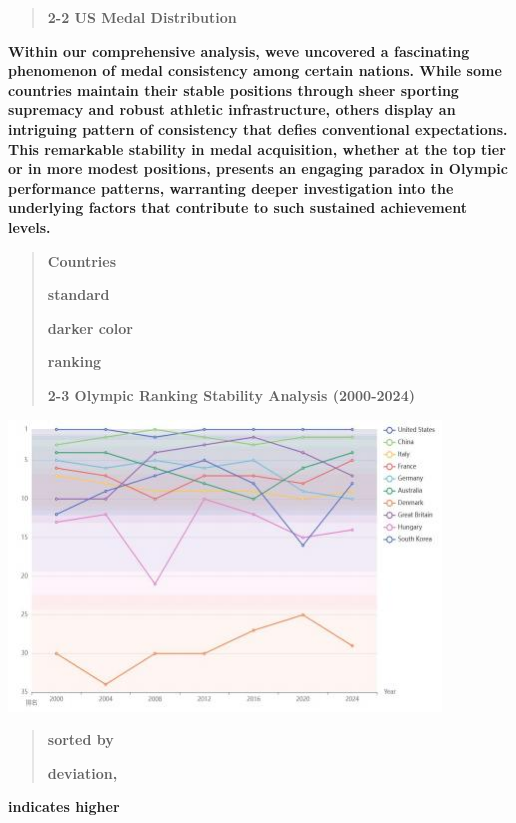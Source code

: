 \documentclass[12pt,a4paper]{article}
\renewenvironment{quote}{\begin{quotation}}{\end{quotation}}  %
\begin{document}
    \begin{quote}
    \textbf{2-2 US Medal Distribution}
    \end{quote}
    
    \textbf{Within our comprehensive analysis, we\textquotesingle ve
    uncovered a fascinating phenomenon of medal consistency among certain
    nations. While some countries maintain their stable positions through
    sheer sporting supremacy and robust athletic infrastructure, others
    display an intriguing pattern of consistency that defies conventional
    expectations. This remarkable stability in medal acquisition, whether at
    the top tier or in more modest positions, presents an engaging paradox
    in Olympic performance patterns, warranting deeper investigation into
    the underlying factors that contribute to such sustained achievement
    levels.}
    
    \begin{quote}
    \textbf{Countries}
    
    \textbf{standard}
    
    \textbf{darker color}
    
    \textbf{ranking}
    
    \textbf{2-3 Olympic Ranking Stability Analysis (2000-2024)}
    \end{quote}
    
    \includegraphics[width=4.52167in,height=3.0421in]{./media/media/image5.jpeg}
    
    \begin{quote}
    \textbf{sorted by}
    
    \textbf{deviation,}
    \end{quote}
    
    \textbf{indicates higher}
    
\end{document}
